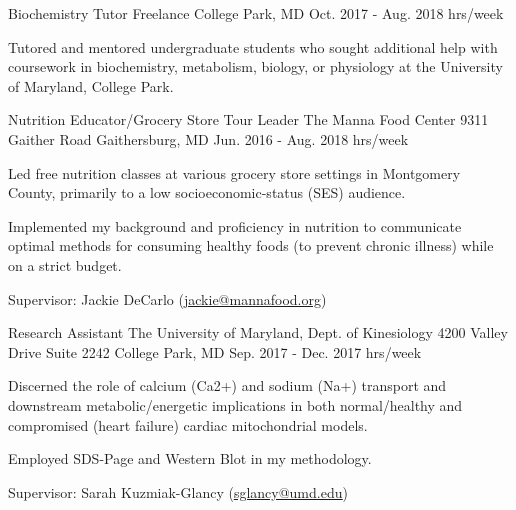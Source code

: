 \begin{cventries}
  \cventry
    {Biochemistry Tutor} %
    {Freelance} %
    {College Park, MD} %
    {Oct. 2017 - Aug. 2018  hrs/week} %
    {
      \begin{cvitems} %
        \item {Tutored and mentored undergraduate students who sought additional help with coursework in biochemistry, metabolism, biology, or physiology at the University of Maryland, College Park.}
      \end{cvitems}
    }


  \cventry
    {Nutrition Educator/Grocery Store Tour Leader } %
    {The Manna Food Center } %
    {9311 Gaither Road \newline
Gaithersburg, MD} %
    {Jun. 2016 - Aug. 2018  hrs/week} %
    {
      \begin{cvitems} %
        \item {Led free nutrition classes at various grocery store settings in Montgomery County, primarily to a low socioeconomic-status (SES) audience.}
        \item {Implemented my background and proficiency in nutrition to communicate optimal methods for consuming healthy foods (to prevent chronic illness) while on a strict budget.}
        \item {Supervisor: Jackie DeCarlo (\textcolor{navyblue}{\underline{\href{mailto:jackie@mannafood.org}{jackie@mannafood.org}}})}
      \end{cvitems}
    }



  \cventry
    {Research Assistant} %
    {The University of Maryland, Dept. of Kinesiology} %
    {4200 Valley Drive \newline Suite 2242 \newline College Park, MD} %
    {Sep. 2017 - Dec. 2017  hrs/week} %
    {
      \begin{cvitems} %
        \item {Discerned the role of calcium (Ca2+) and sodium (Na+) transport and downstream metabolic/energetic implications in both normal/healthy and compromised (heart failure) cardiac mitochondrial models.}
        \item{Employed SDS-Page and Western Blot in my methodology.}
        \item{Supervisor: Sarah Kuzmiak-Glancy (\textcolor{navyblue}{
        {\underline{\href{mailto:sglancy@umd.edu}{sglancy@umd.edu}}}})}
      \end{cvitems}
    }


\end{cventries}

